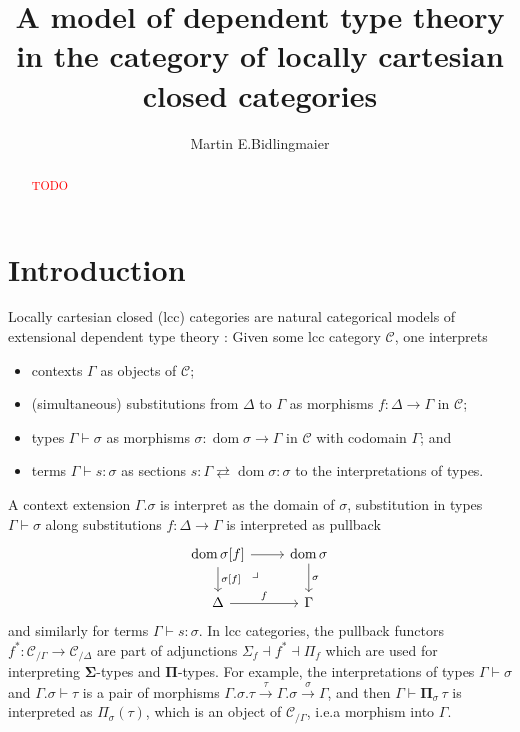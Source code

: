 \documentclass{article}
\newcommand{\todo}[1]{\textcolor{red}{#1}}
\theoremstyle{remark}
\theoremstyle{definition}
\begin{document}
\title{A model of dependent type theory in the category of locally cartesian closed categories}

\author{Martin E.\@ Bidlingmaier}

\maketitle

\begin{abstract}
  \todo{TODO}
\end{abstract}

\section{Introduction}

Locally cartesian closed (lcc) categories are natural categorical models of extensional dependent type theory \cite{lcc-categories-and-type-theory}:
Given some lcc category $\mathcal{C}$, one interprets
\begin{itemize}
  \item
    contexts $\Gamma$ as objects of $\mathcal{C}$;
  \item
    (simultaneous) substitutions from $\Delta$ to $\Gamma$ as morphisms $f : \Delta \rightarrow \Gamma$ in $\mathcal{C}$;
  \item
    types $\Gamma \vdash \sigma$ as morphisms $\sigma : \operatorname{dom} \sigma \rightarrow \Gamma$ in $\mathcal{C}$ with codomain $\Gamma$; and
  \item
    terms $\Gamma \vdash s : \sigma$ as sections $s : \Gamma \rightleftarrows \operatorname{dom} \sigma : \sigma$ to the interpretations of types.
\end{itemize}
A context extension $\Gamma.\sigma$ is interpret as the domain of $\sigma$, substitution in types $\Gamma \vdash \sigma$ along substitutions $f : \Delta \rightarrow \Gamma$ is interpreted as pullback
\begin{equation}
  \begin{tikzcd}
    \operatorname{dom} \sigma[f] \arrow[r] \arrow[d, "{\sigma[f]}"] \arrow[dr, phantom, near start, "\lrcorner"] & \operatorname{dom} \sigma \arrow[d, "\sigma"] \\
    \Delta \arrow[r, "f"] & \Gamma
  \end{tikzcd}
\end{equation}
and similarly for terms $\Gamma \vdash s : \sigma$.
In lcc categories, the pullback functors $f^* : \mathcal{C}_{/ \Gamma} \rightarrow \mathcal{C}_{/ \Delta}$ are part of adjunctions $\Sigma_f \dashv f^* \dashv \Pi_f$ which are used for interpreting $\mathbf{\Sigma}$-types and $\mathbf{\Pi}$-types.
For example, the interpretations of types $\Gamma \vdash \sigma$ and $\Gamma.\sigma \vdash \tau$ is a pair of morphisms $\Gamma.\sigma.\tau \xrightarrow{\tau} \Gamma.\sigma \xrightarrow{\sigma} \Gamma$, and then $\Gamma \vdash \mathbf{\Pi}_\sigma \, \tau$ is interpreted as $\Pi_\sigma(\tau)$, which is an object of $\mathcal{C}_{/ \Gamma}$, i.e.\@ a morphism into $\Gamma$.
\end{document}
